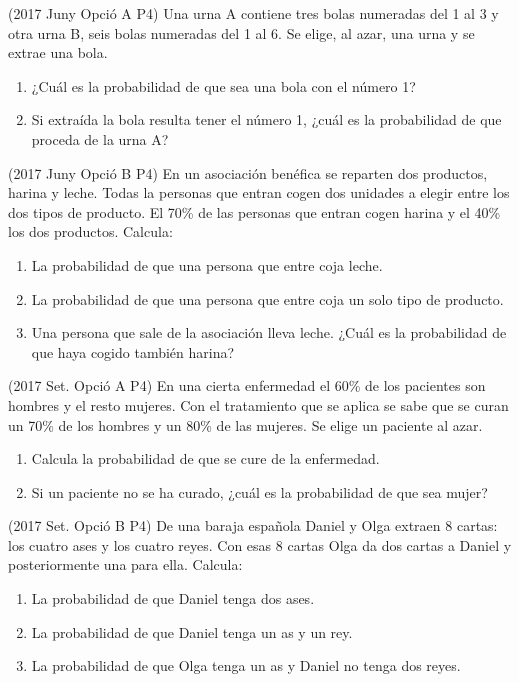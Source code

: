 \item (2017 Juny Opció A P4) Una urna A contiene tres bolas numeradas del 1 al 3 y otra urna B, seis bolas numeradas del 1 al 6. Se elige, al azar, una urna y se extrae una bola.
\begin{enumerate}
 \item ¿Cuál es la probabilidad de que sea una bola con el número 1?
 \item Si extraída la bola resulta tener el número 1, ¿cuál es la probabilidad de que proceda de la urna A?
\end{enumerate}

\item (2017 Juny Opció B P4) En un asociación benéfica se reparten dos productos, harina y leche. Todas la personas que entran cogen dos unidades a elegir entre los dos tipos de producto. El 70\% de las personas que entran cogen harina y el 40\% los dos productos. Calcula:
\begin{enumerate}
 \item La probabilidad de que una persona que entre coja leche.
 \item La probabilidad de que una persona que entre coja un solo tipo de producto.
 \item Una persona que sale de la asociación lleva leche. ¿Cuál es la probabilidad de que haya cogido también harina?
\end{enumerate}

\item (2017 Set. Opció A P4) En una cierta enfermedad el 60\% de los pacientes son hombres y el resto mujeres. Con el tratamiento que se aplica se sabe que se curan un 70\% de los hombres y un 80\% de las mujeres. Se elige un paciente al azar.
\begin{enumerate}
 \item Calcula la probabilidad de que se cure de la enfermedad.
 \item Si un paciente no se ha curado, ¿cuál es la probabilidad de que sea mujer?
\end{enumerate}

\item (2017 Set. Opció B P4) De una baraja española Daniel y Olga extraen 8 cartas: los cuatro ases y los cuatro reyes. Con esas 8 cartas Olga da dos cartas a Daniel y posteriormente una para ella. Calcula:
\begin{enumerate}
 \item La probabilidad de que Daniel tenga dos ases.
 \item  La probabilidad de que Daniel tenga un as y un rey.
 \item  La probabilidad de que Olga tenga un as y Daniel no tenga dos reyes.
\end{enumerate}

